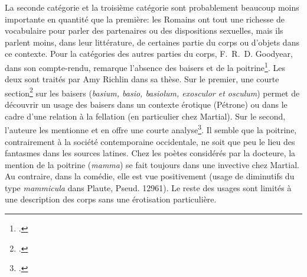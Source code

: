 La seconde catégorie et la troisième catégorie sont probablement beaucoup moins importante en quantité que la première: les Romains ont tout une richesse de vocabulaire pour parler des partenaires ou des dispositions sexuelles, mais ils parlent moins, dans leur littérature, de certaines partie du corps ou d'objets dans ce contexte. Pour la catégories des autres parties du corps, F.~R.~D. Goodyear, dans son compte-rendu, remarque l'absence des baisers et de la poitrine\footcite{goodyear_praefanda_1985}. Les deux sont traités par Amy Richlin dans sa thèse. Sur le premier, une courte section\footcite[pp.~351--354]{richlin_sexual_1978} sur les baisers (\textit{basium, basio, basiolum, exosculor et osculum}) permet de découvrir un usage des baisers dans un contexte érotique (Pétrone) ou dans le cadre d'une relation à la fellation (en particulier chez Martial). Sur le second, l'auteure les mentionne et en offre une courte analyse\footcite[pp.~229--232]{richlin_sexual_1978}. Il semble que la poitrine, contrairement à la société contemporaine occidentale, ne soit que peu le lieu des fantasmes dans les sources latines. Chez les poètes considérés par la docteure, la mention de la poitrine (\textit{mamma}) se fait toujours dans une invective chez Martial. Au contraire, dans la comédie, elle est vue positivement (usage de diminutifs du type \textit{mammicula} dans Plaute, Pseud. 12961). Le reste des usages sont limités à une description des corps sans une érotisation particulière.

